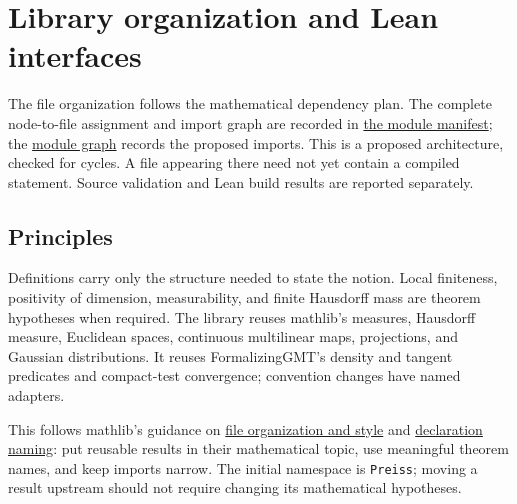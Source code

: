 \chapter{Library organization and Lean interfaces}

The file organization follows the mathematical dependency plan. The complete
node-to-file assignment and import graph are recorded in
\href{modules.json}{the module manifest}; the
\href{modules.svg}{module graph} records the proposed imports.
This is a proposed architecture, checked for cycles. A file appearing there
need not yet contain a compiled statement. Source validation and Lean build
results are reported separately.

\section{Principles}
Definitions carry only the structure needed to state the notion. Local
finiteness, positivity of dimension, measurability, and finite Hausdorff mass
are theorem hypotheses when required. The library reuses mathlib's measures,
Hausdorff measure, Euclidean spaces, continuous multilinear maps, projections,
and Gaussian distributions. It reuses FormalizingGMT's density and tangent
predicates and compact-test convergence; convention changes have named adapters.

This follows mathlib's guidance on
\href{https://mathlib.org/contribute/style.html}{file organization and style}
and \href{https://mathlib.org/contribute/naming.html}{declaration naming}:
put reusable results in their mathematical topic, use meaningful theorem names,
and keep imports narrow. The initial namespace is \texttt{Preiss}; moving a
result upstream should not require changing its mathematical hypotheses.

